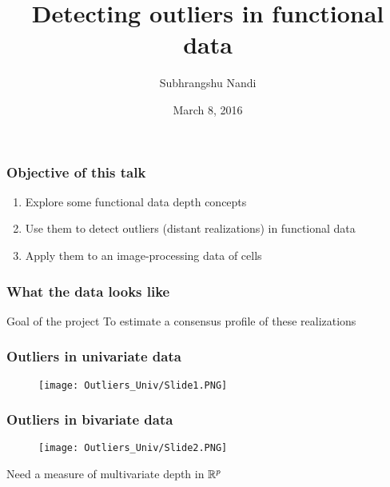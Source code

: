 \documentclass[10pt,dvipsnames,table]{beamer}
\title[Functional outliers]{Detecting outliers in functional data}
\author[S. Nandi]{Subhrangshu Nandi}
\institute[UW Madison]{
Department of Statistics \\
University of Wisconsin-Madison \\
\vspace{1cm}
ENAR 2016}
\date{March 8, 2016}
\begin{document}
\setlength{\baselineskip}{16truept}

\frame{\maketitle}

\begin{frame}
\frametitle{Objective of this talk}
{\Large{
\begin{enumerate}
\item Explore some functional data depth concepts
\vspace{0.5cm}
\item Use them to detect outliers (distant realizations) in functional data
\vspace{0.5cm}
\item Apply them to an image-processing data of cells
\end{enumerate}
}}
\end{frame}

\begin{frame}
\frametitle{What the data looks like}


\begin{block}{Goal of the project}
To estimate a consensus profile of these realizations
\end{block}
\end{frame}

\begin{frame}
\frametitle{Outliers in univariate data}
\vspace{-0.5cm}
\begin{figure}[t]
\centering
\texttt{[image: Outliers\_Univ/Slide1.PNG]}
\end{figure}

\end{frame}

\begin{frame}
\frametitle{Outliers in bivariate data}
\vspace{-0.5cm}
\begin{figure}[t]
\centering
\texttt{[image: Outliers\_Univ/Slide2.PNG]}
\end{figure}
\vspace{-0.5cm}
{\footnotesize{Need a measure of multivariate depth in $\mathbb{R} ^ p$}}
\end{frame}
\end{document}
